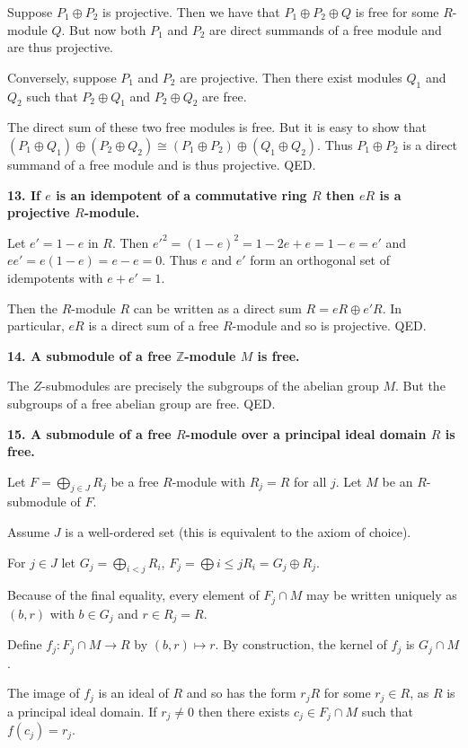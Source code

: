\documentclass[12pt]{article}
\newcommand{\Z}{\mathbb{Z}}
\begin{document}
Suppose $P_1\oplus P_2$ is projective. Then we have that $P_1\oplus P_2\oplus Q$ is free for some $R$-module $Q$. But now both $P_1$ and $P_2$ are direct summands of a free module and are thus projective.

Conversely, suppose $P_1$ and $P_2$ are projective. Then there exist modules $Q_1$ and $Q_2$ such that $P_2\oplus Q_1$ and $P_2\oplus Q_2$ are free.

The direct sum of these two free modules is free. But it is easy to show that $(P_1\oplus Q_1)\oplus (P_2\oplus Q_2) \cong (P_1\oplus P_2)\oplus (Q_1\oplus Q_2)$. Thus $P_1\oplus P_2$ is a direct summand of a free module and is thus projective. QED.

\textbf{13. If $e$ is an idempotent of a commutative ring $R$ then $eR$ is a projective $R$-module.}

Let $e' = 1 - e$ in $R$. Then $e'^2 = (1 - e)^2 = 1 - 2e + e = 1 - e = e'$ and $ee' = e(1 - e) = e - e = 0$. Thus $e$ and $e'$ form an orthogonal set of idempotents with $e + e' = 1$.

Then the $R$-module $R$ can be written as a direct sum $R = eR \oplus e'R$. In particular, $eR$ is a direct sum of a free $R$-module and so is projective. QED.

\textbf{14. A submodule of a free $\Z$-module $M$ is free.}

The $Z$-submodules are precisely the subgroups of the abelian group $M$. But the subgroups of a free abelian group are free. QED.

\textbf{15. A submodule of a free $R$-module over a principal ideal domain $R$ is free.}

Let $F = \bigoplus_{j \in J} R_j$ be a free $R$-module with $R_j = R$ for all $j$. Let $M$ be an $R$-submodule of $F$.

Assume $J$ is a well-ordered set (this is equivalent to the axiom of choice).

For $j \in J$ let $G_j = \bigoplus_{i < j} R_i$, $F_j = \bigoplus {i\leq j} R_i = G_j\oplus R_j$.

Because of the final equality, every element of $F_j\cap M$ may be written uniquely as $(b, r)$ with $b \in G_j$ and $r \in R_j = R$.

Define $f_j : F_j\cap M \to R$ by $(b, r) \mapsto r$. By construction, the kernel of $f_j$ is $G_j\cap M$. 

The image of $f_j$ is an ideal of $R$ and so has the form $r_jR$ for some $r_j \in R$, as $R$ is a principal ideal domain. If $r_j \neq 0$ then there exists $c_j \in F_j\cap M$ such that $f(c_j) = r_j$.
\end{document}
